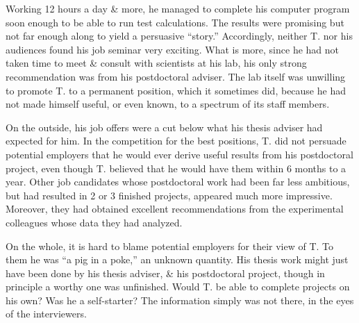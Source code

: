\documentclass{article}
\begin{document}
\begin{enumerate}
\begin{itemize}
\begin{itemize}
			Working 12 hours a day \& more, he managed to complete his computer program soon enough to be able to run test calculations. The results were promising but not far enough along to yield a persuasive ``story.'' Accordingly, neither T. nor his audiences found his job seminar very exciting. What is more, since he had not taken time to meet \& consult with scientists at his lab, his only strong recommendation was from his postdoctoral adviser. The lab itself was unwilling to promote T. to a permanent position, which it sometimes did, because he had not made himself useful, or even known, to a spectrum of its staff members.
			
			On the outside, his job offers were a cut below what his thesis adviser had expected for him. In the competition for the best positions, T. did not persuade potential employers that he would ever derive useful results from his postdoctoral project, even though T. believed that he would have them within 6 months to a year. Other job candidates whose postdoctoral work had been far less ambitious, but had resulted in 2 or 3 finished projects, appeared much more impressive. Moreover, they had obtained excellent recommendations from the experimental colleagues whose data they had analyzed.
			
			On the whole, it is hard to blame potential employers for their view of T. To them he was ``a pig in a poke,'' an unknown quantity. His thesis work might just have been done by his thesis adviser, \& his postdoctoral project, though in principle a worthy one was unfinished. Would T. be able to complete projects on his own? Was he a self-starter? The information simply was not there, in the eyes of the interviewers.
			

\end{itemize}
\end{itemize}
\end{enumerate}
\end{document}
